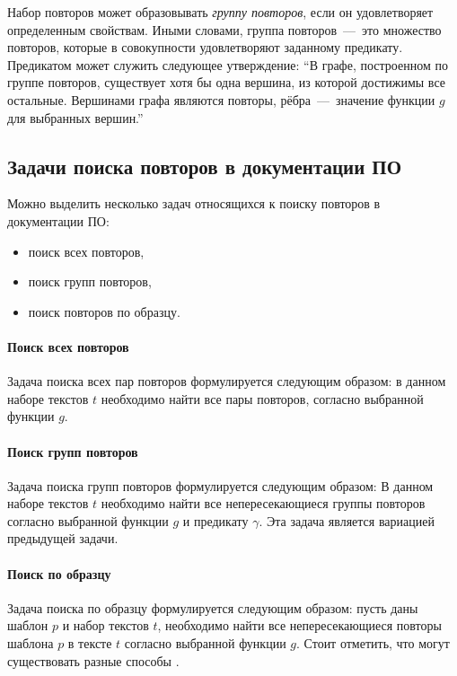 
Набор повторов может образовывать \emph{группу повторов}, если он удовлетворяет определенным свойствам. Иными словами, группа повторов~---~это множество повторов, которые в совокупности удовлетворяют заданному предикату.
Предикатом может служить следующее утверждение: ``В графе, построенном по группе повторов, существует хотя бы одна вершина, из которой достижимы все остальные. Вершинами графа являются повторы, рёбра~---~значение функции $g$ для выбранных вершин.''


\subsection{Задачи поиска повторов в документации ПО}

Можно выделить несколько задач относящихся к поиску повторов в документации ПО:
\begin{itemize}
\item поиск всех повторов,
\item поиск групп повторов,
\item поиск повторов по образцу.
\end{itemize}

\paragraph{Поиск всех повторов}
Задача поиска всех пар повторов формулируется следующим образом: в данном наборе текстов $t$ необходимо найти все пары повторов, согласно выбранной функции $g$.

\paragraph{Поиск групп повторов}
Задача поиска групп повторов формулируется следующим образом:
В данном наборе текстов $t$ необходимо найти все непересекающиеся группы повторов согласно выбранной функции $g$ и предикату $\gamma$.
Эта задача является вариацией предыдущей задачи.

\paragraph{Поиск по образцу}
Задача поиска по образцу формулируется следующим образом:
пусть даны шаблон $p$ и набор текстов $t$, необходимо найти все непересекающиеся повторы шаблона $p$ в тексте $t$ согласно выбранной функции  $g$.
Стоит отметить, что могут существовать разные способы .

